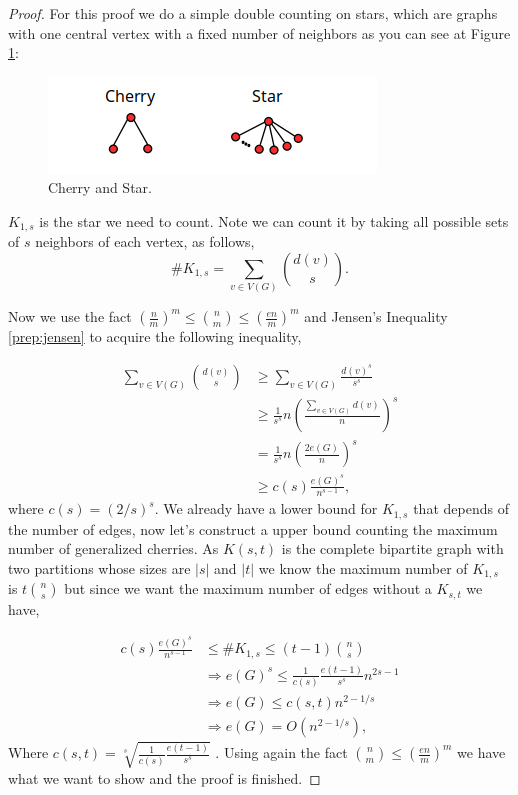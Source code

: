 \documentclass[12pt,twoside,a4paper]{book}
\numberwithin{equation}{section}
\theoremstyle{remark}
\begin{document}
\begin{proof}

For this proof we do a simple double counting on stars, which are graphs with one central vertex with a fixed number of neighbors as you can see at Figure \ref{fig:generalizedcherry}:

\begin{figure}[!htb]
     \centering
     \includegraphics[scale=1]{Figuras/cherry-and-star.png}
     \caption{Cherry and Star.}
     \label{fig:generalizedcherry}
\end{figure}

$K_{1,s}$ is the star we need to count. Note we can count it by taking all possible sets of $s$ neighbors of each vertex, as follows,
$$ \# K_{1,s} = \sum_{v \in V(G)} \binom{d(v)}{s} .$$

Now we use the fact $\left(\frac{n}{m}\right)^m \leq \binom{n}{m} \leq \left(\frac{en}{m}\right)^m$ and Jensen's Inequality \ref{prep:jensen} to acquire the following inequality,

\begin{align*} 
\sum_{v \in V(G)} \binom{d(v)}{s} & \geq \sum_{v \in V(G)}\frac{d(v)^s}{s^s}\\ 
& \geq \frac{1}{s^s} n \left( \frac{\sum_{v \in V(G)} d(v)}{n} \right) ^s \\
& = \frac{1}{s^s} n \left( \frac{ 2 e(G)}{n} \right) ^s \\
& \geq c(s) \frac{e(G)^s}{n^{s-1}},
\end{align*}
where $c(s) = \left(2/s\right)^s$.
We already have a lower bound for $K_{1,s}$ that depends of the number of edges, now let's construct a upper bound counting the maximum number of generalized cherries.
As $K(s,t)$ is the complete bipartite graph with two partitions whose sizes are $|s|$ and $|t|$ we know the maximum number of $K_{1,s}$ is $t\binom{n}{s}$ but since we want the maximum number of edges without a $K_{s,t}$ we have,

\begin{align*}
c(s) \frac{e(G)^s}{n^{s-1}} &\leq \# K_{1,s} \leq (t-1) \binom{n}{s}\\
		       & \Rightarrow e(G)^s \leq \frac{1}{c(s)}\frac{e(t-1)}{s^s}n^{2s-1}\\
		       &\Rightarrow e(G) \leq c(s,t) n^{2-1/s}\\
		       &\Rightarrow e(G) = O(n^{2-1/s}),
\end{align*}
Where $c(s,t)= \sqrt[s]{\frac{1}{c(s)}\frac{e(t-1)}{s^s}}$ . Using again the fact $\binom{n}{m} \leq \left(\frac{en}{m}\right)^m$ we have what we want to show and the proof is finished.
\end{proof}
\end{document}
